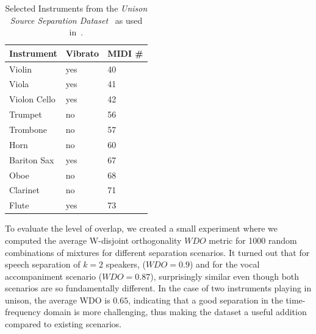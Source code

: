 \begin{table}
\begin{center}
\footnotesize
\begin{tabular}{ l l l}
  Instrument & Vibrato &  MIDI \# \\
  \hline
  Violin & yes & 40 \\
  Viola & yes & 41 \\
  Violon Cello & yes & 42 \\
  Trumpet & no & 56 \\
  Trombone & no & 57\\
  Horn & no & 60  \\
  Bariton Sax & yes & 67 \\
  Oboe & no & 68\\
  Clarinet & no & 71\\
  Flute & yes & 73\\
\end{tabular}
\end{center}
\caption{Selected Instruments from the \emph{Unison Source Separation Dataset}~\cite{oss_unison} as used in~\cite{stoeter14, stoeter16}.}
\label{tab:testset}
\end{table}

To evaluate the level of overlap, we created a small experiment where we computed the average W-disjoint orthogonality \(WDO\) metric for 1000 random combinations of mixtures for different separation scenarios.
It turned out that for speech separation of \(k=2\) speakers, (\(WDO=0.9\)) and for the vocal accompaniment scenario (\(WDO=0.87\)), surprisingly similar even though both scenarios are so fundamentally different.
In the case of two instruments playing in unison, the average WDO is \(0.65\), indicating that a good separation in the time-frequency domain is more challenging, thus making the dataset a useful addition compared to existing scenarios.


